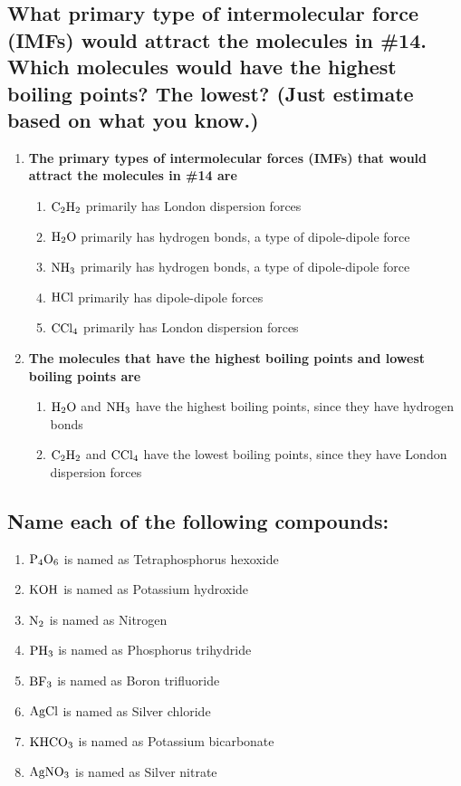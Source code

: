 \documentclass[11pt]{article}
\begin{document}
\subsection{What primary type of intermolecular force (IMFs) would attract the molecules in \#14. Which molecules would have the highest boiling points? The lowest? (Just estimate based on what you know.)}
\label{sec:orgc05e1be}
\begin{enumerate}
\item \textbf{The primary types of intermolecular forces (IMFs) that would attract the molecules in \#14 are}
\begin{enumerate}
\item \(\ce{C2H2}\) primarily has London dispersion forces
\item \(\ce{H2O}\) primarily has hydrogen bonds, a type of dipole-dipole force
\item \(\ce{NH3}\) primarily has hydrogen bonds, a type of dipole-dipole force
\item \(\ce{HCl}\) primarily has dipole-dipole forces
\item \(\ce{CCl4}\) primarily has London dispersion forces
\end{enumerate}
\item \textbf{The molecules that have the highest boiling points and lowest boiling points are}
\begin{enumerate}
\item \(\ce{H2O}\) and \(\ce{NH3}\)  have the highest boiling points, since they have hydrogen bonds
\item \(\ce{C2H2}\) and \(\ce{CCl4}\) have the lowest boiling points, since they have London dispersion forces
\end{enumerate}
\end{enumerate}

\subsection{Name each of the following compounds:}
\label{sec:org450820d}
\begin{enumerate}
\item \(\ce{P4O6}\) is named as Tetraphosphorus hexoxide
\item \(\ce{KOH}\) is named as Potassium hydroxide
\item \(\ce{N2}\) is named as Nitrogen
\item \(\ce{PH3}\) is named as Phosphorus trihydride
\item \(\ce{BF3}\) is named as Boron trifluoride
\item \(\ce{AgCl}\) is named as Silver chloride
\item \(\ce{KHCO3}\) is named as Potassium bicarbonate
\item \(\ce{AgNO3}\) is named as Silver nitrate
\end{enumerate}
\end{document}

